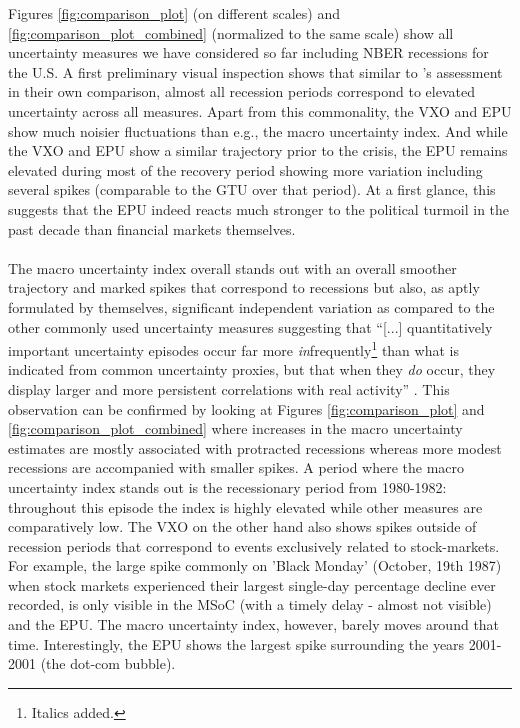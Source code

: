 \documentclass[a4paper,12pt,oneside,pointednumbers,bibtotoc,bigheadings,liststotoc]{scrbook}
\begin{document}
Figures \ref{fig:comparison_plot} (on different scales) and \ref{fig:comparison_plot_combined} (normalized to the same scale) show all uncertainty measures we have considered so far including NBER recessions for the U.S. A first preliminary visual inspection shows that similar to \citet{bachmannetal:13}'s assessment in their own comparison, almost all recession periods correspond to elevated uncertainty across all measures. Apart from this commonality, the VXO and EPU show much noisier fluctuations than e.g., the macro uncertainty index. And while the VXO and EPU show a similar trajectory prior to the crisis, the EPU remains elevated during most of the recovery period showing more variation including several spikes (comparable to the GTU over that period). At a first glance, this suggests that the EPU indeed reacts much stronger to the political turmoil in the past decade than financial markets themselves. \\
\\
The macro uncertainty index overall stands out with an overall smoother trajectory and marked spikes that correspond to recessions but also, as aptly formulated by \citet{juradoetal:15} themselves, significant independent variation as compared to the other commonly used uncertainty measures suggesting that ``[...] quantitatively important uncertainty episodes occur far more \textit{in}frequently\footnote{Italics added.} than what is indicated from common uncertainty proxies, but that when they \textit{do} occur, they display larger and more persistent correlations with real activity'' \citep[p. 1181]{juradoetal:15}. This observation can be confirmed by looking at Figures \ref{fig:comparison_plot} and \ref{fig:comparison_plot_combined} where increases in the macro uncertainty estimates are mostly associated with protracted recessions whereas more modest recessions are accompanied with smaller spikes. A period where the macro uncertainty index stands out is the recessionary period from 1980-1982: throughout this episode the index is highly elevated while other measures are comparatively low. The VXO on the other hand also shows spikes outside of recession periods that correspond to events exclusively related to stock-markets. For example, the large spike commonly on 'Black Monday' (October, 19th 1987) when stock markets experienced their largest single-day percentage decline ever recorded, is only visible in the MSoC (with a timely delay - almost not visible) and the EPU. The macro uncertainty index, however, barely moves around that time. Interestingly, the EPU shows the largest spike surrounding the years 2001-2001 (the dot-com bubble). 
\end{document}
